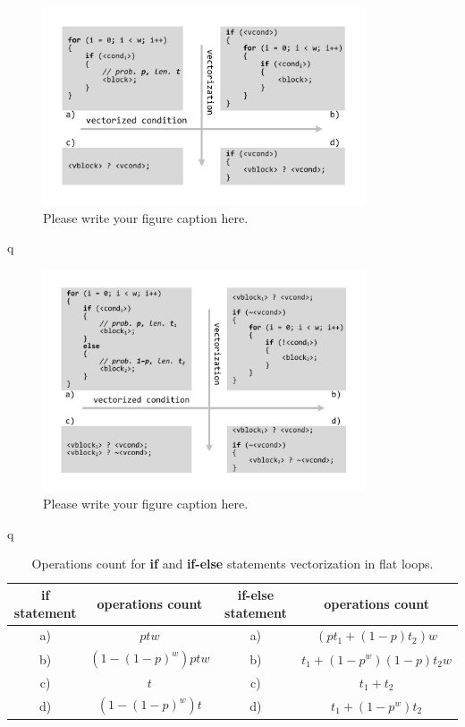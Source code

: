 \documentclass[
11pt,%
tightenlines,%
twoside,%
onecolumn,%
nofloats,%
nobibnotes,%
nofootinbib,%
superscriptaddress,%
noshowpacs,%
centertags]%
{revtex4}
\begin{document}
\begin{figure}[h]
\setcaptionmargin{5mm}
\onelinecaptionstrue  %
\includegraphics[width=0.85\textwidth]{pics/if_vectorization.pdf}
\caption{Please write your figure caption here.}\label{fig:1}
\end{figure}

q

\begin{figure}[h]
\setcaptionmargin{5mm}
\onelinecaptionstrue  %
\includegraphics[width=0.85\textwidth]{pics/if_else_vectorization.pdf}
\caption{Please write your figure caption here.}\label{fig:1}
\end{figure}

q

\begin{table}[!h]
\setcaptionmargin{0mm}
\onelinecaptionsfalse
{}
\caption{Operations count for \textbf{if} and \textbf{if-else} statements vectorization in flat loops.}
\bigskip
\begin{tabular}{|c|c|c|c|}
\hline
\textbf{if} statement & operations count & \textbf{if-else} statement & operations count \\
\hline
a) & $ptw$ & a) & $\left( pt_1 + (1 - p)t_2 \right)w$ \\
b) & $\left( 1 - (1 - p)^w \right)ptw$ & b) & $t_1 + (1 - p^w)(1 - p)t_2w$ \\
c) & $t$ & c) & $t_1 + t_2$ \\
d) & $\left( 1 - (1 - p)^w \right)t$ & d) & $t_1 + (1 - p^w)t_2$ \\
\hline
\end{tabular}
\end{table}
\end{document}
